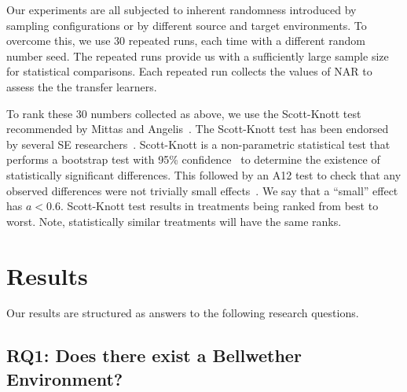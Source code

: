 \documentclass[10pt,journal,compsoc]{IEEEtran}
\begin{document}
Our experiments are all subjected to inherent randomness introduced by sampling configurations or by different source and target environments. To overcome this, we use 30 repeated runs, each time with a different random number seed. The repeated runs provide us with a sufficiently large sample size for statistical comparisons. Each repeated run collects the values of NAR to assess the the transfer learners.

To rank these 30 numbers collected as above, we use the Scott-Knott test 
recommended by Mittas and Angelis~\cite{mittas13}. The Scott-Knott test has been endorsed by several SE researchers~\cite{leech2002call, poulding10, arcuri11, shepperd12a, kampenes07, Kocaguneli2013:ep}. Scott-Knott is a non-parametric statistical test that performs a bootstrap test with 95\% confidence~\cite{efron93} to determine the existence of statistically significant differences. This followed by an A12 test to check that any observed differences were not trivially small effects~\cite{Vargha00}. We say that a ``small'' effect has $a <0.6$. 
Scott-Knott test results in treatments being ranked from best to worst. Note, statistically similar treatments will have the same ranks.

\section{Results}
\label{sect:results}

\noindent Our results are structured as answers to the following research questions.

\subsection*{RQ1: Does there exist a Bellwether Environment?}\label{subsec:rq1}
\end{document}
